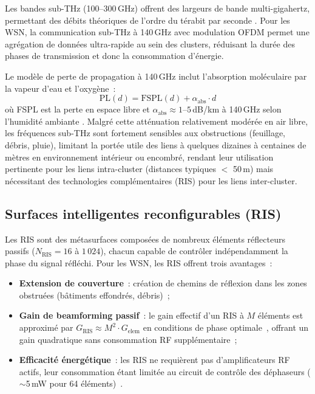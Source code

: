 Les bandes sub-THz (100--300\,GHz) offrent des largeurs de bande multi-gigahertz, permettant des débits théoriques de l'ordre du térabit par seconde \cite{saad2020vision6g,etri_6g_disaster2024}. Pour les WSN, la communication sub-THz à 140\,GHz avec modulation OFDM permet une agrégation de données ultra-rapide au sein des clusters, réduisant la durée des phases de transmission et donc la consommation d'énergie.

Le modèle de perte de propagation à 140\,GHz inclut l'absorption moléculaire par la vapeur d'eau et l'oxygène~:
\begin{equation}
    \text{PL}(d) = \text{FSPL}(d) + \alpha_{\text{abs}} \cdot d
\end{equation}
où FSPL est la perte en espace libre et $\alpha_{\text{abs}} \approx 1$--$5$\,dB/km à 140\,GHz selon l'humidité ambiante \cite{saad2020vision6g}. Malgré cette atténuation relativement modérée en air libre, les fréquences sub-THz sont fortement sensibles aux obstructions (feuillage, débris, pluie), limitant la portée utile des liens à quelques dizaines à centaines de mètres en environnement intérieur ou encombré, rendant leur utilisation pertinente pour les liens intra-cluster (distances typiques $<$ 50\,m) mais nécessitant des technologies complémentaires (RIS) pour les liens inter-cluster.

\subsection{Surfaces intelligentes reconfigurables (RIS)}

Les RIS sont des métasurfaces composées de nombreux éléments réflecteurs passifs ($N_{\text{RIS}} = 16$ à $1\,024$), chacun capable de contrôler indépendamment la phase du signal réfléchi. Pour les WSN, les RIS offrent trois avantages~:
\begin{itemize}
    \item \textbf{Extension de couverture}~: création de chemins de réflexion dans les zones obstruées (bâtiments effondrés, débris)~;
    \item \textbf{Gain de beamforming passif}~: le gain effectif d'un RIS à $M$ éléments est approximé par $G_{\text{RIS}} \approx M^2 \cdot G_{\text{elem}}$ en conditions de phase optimale~\cite{huang2021ris}, offrant un gain quadratique sans consommation RF supplémentaire~;
    \item \textbf{Efficacité énergétique}~: les RIS ne requièrent pas d'amplificateurs RF actifs, leur consommation étant limitée au circuit de contrôle des déphaseurs ($\sim$5\,mW pour 64 éléments)~\cite{huang2021ris}.
\end{itemize}


